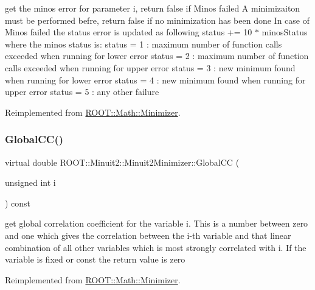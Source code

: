 get the minos error for parameter i, return false if Minos failed A minimizaiton must be performed befre, return false if no minimization has been done In case of Minos failed the status error is updated as following status += 10 $\ast$ minos\+Status where the minos status is\+: status = 1 \+: maximum number of function calls exceeded when running for lower error status = 2 \+: maximum number of function calls exceeded when running for upper error status = 3 \+: new minimum found when running for lower error status = 4 \+: new minimum found when running for upper error status = 5 \+: any other failure 

Reimplemented from \mbox{\hyperlink{classROOT_1_1Math_1_1Minimizer_aeaef75b766eff7088939259c842ab056}{R\+O\+O\+T\+::\+Math\+::\+Minimizer}}.

\mbox{\label{classROOT_1_1Minuit2_1_1Minuit2Minimizer_adde21edb0a67e0eef950049528cfb9a7}} 
\subsubsection{\texorpdfstring{GlobalCC()}{GlobalCC()}\hspace{0.1cm}{\footnotesize\ttfamily [1/2]}}
{\footnotesize\ttfamily virtual double R\+O\+O\+T\+::\+Minuit2\+::\+Minuit2\+Minimizer\+::\+Global\+CC (\begin{DoxyParamCaption}\item[{unsigned int}]{i }\end{DoxyParamCaption}) const\hspace{0.3cm}{\ttfamily [virtual]}}

get global correlation coefficient for the variable i. This is a number between zero and one which gives the correlation between the i-\/th variable and that linear combination of all other variables which is most strongly correlated with i. If the variable is fixed or const the return value is zero 

Reimplemented from \mbox{\hyperlink{classROOT_1_1Math_1_1Minimizer_a6b50b0b0ccb0cb23da281ef978d145c5}{R\+O\+O\+T\+::\+Math\+::\+Minimizer}}.

\mbox{\label{classROOT_1_1Minuit2_1_1Minuit2Minimizer_adde21edb0a67e0eef950049528cfb9a7}} 
